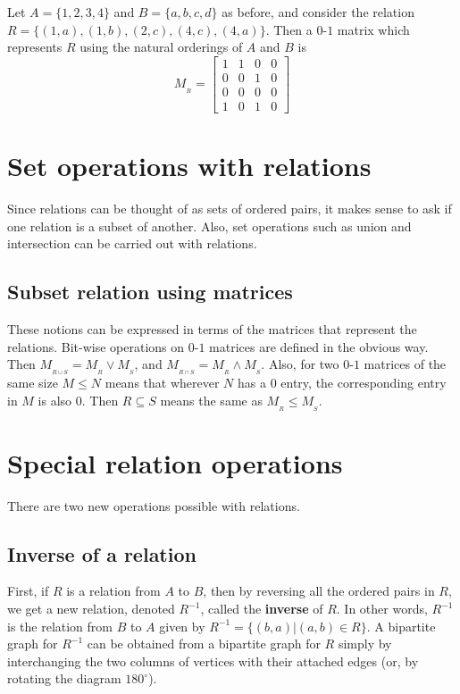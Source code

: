 \begin{exmp}
 Let $A=\{1,2,3,4\}$ and $B=\{a,b,c,d\}$ as before, and consider the 
 relation $R=\{(1,a),(1,b),(2,c),(4,c),(4,a)\}$.  Then a $0$-$1$ matrix which represents 
 $R$ using the natural orderings of $A$ and $B$ is%
\[ M_{_R}= %
 \left[
   \begin{matrix}
    1&1&0&0\\ 0&0&1&0\\ 0&0&0&0\\ 1&0&1&0 
   \end{matrix}
 \right] 
\]
\end{exmp}

\section{Set operations with relations}
Since relations can be thought of as sets of ordered pairs, it makes sense to
ask if one relation is a subset of another. Also, set operations such as union 
and intersection can be carried out with relations. 

\subsection{Subset relation using matrices}These notions can be
expressed in terms of the matrices that represent the relations.
Bit-wise operations on $0$-$1$ matrices are defined in the obvious way.
Then  $M_{_{R\cup S}}=M_{_R}\vee M_{_S}$, and   
$M_{_{R\cap S}}=M_{_R}\land M_{_S}$.
Also, for two $0$-$1$ matrices of the
same size $M\leq N$ means that wherever $N$ has a $0$ entry, the corresponding
entry in $M$ is also $0$. Then
$R\subseteq S$ means the same as  $M_{_R}\leq M_{_S}$.

\section{Special relation operations}
There are two new operations possible with relations.

\subsection{Inverse of a relation}
First, if $R$ is a relation from $A$ to $B$, then by reversing all the
ordered pairs in $R$, we get a new relation, denoted $R^{-1}$, called 
the {\bfseries inverse} of $R$.
In other words, $R^{-1}$ is the  relation from $B$ to $A$ given
by $R^{-1}=\{(b,a)|(a,b)\in R\}$. 
A bipartite graph for $R^{-1}$ can be obtained from a bipartite graph for $R$ 
simply by interchanging 
the two columns of vertices with their attached edges (or, by rotating the diagram $180^\circ$). 

